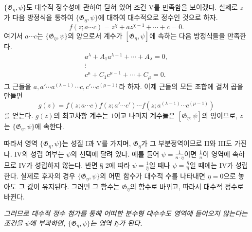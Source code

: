 $\{\mathfrak G_\eta,\psi\}$도 대수적 정수성에 관하여 닫혀 있어 조건 V를 만족함을 보이겠다. 실제로 $z$가 다음 방정식을 통하여 $\{\mathfrak G_\eta,\psi\}$에 대하여 대수적으로 정수인 것으로 하자.
\[
 f(z;a\cdots c)=z^\chi+a z^{\chi-1}+\cdots+c=0.
\]
여기서 $a\cdots c$는 $\{\mathfrak G_\eta,\psi\}$의 양으로서 계수가 $[\mathfrak G_\eta,\psi]$에 속하는 다음 방정식들을 만족한다.
\[
\begin{gathered}
 a^\lambda+A_1a^{\lambda-1}+\cdots+A_\lambda=0,\\
 \vdots\\
 c^\mu+C_1c^{\mu-1}+\cdots+C_\mu=0.
\end{gathered}
\]
그 근들을 $a,a'\cdots a^{(\lambda-1)}\cdots c,c'\cdots c^{(\mu-1)}$라 하자. 이제 근들의 모든 조합에 걸쳐 곱을 만들면
\[
 g(z)=f(z;a\cdots c)f(z;a'\cdots c')\cdots
      f(z;a^{(\lambda-1)}\cdots c^{(\mu-1)})
\]
를 얻는다. $g(z)$의 최고차항 계수는 $1$이고 나머지 계수들은 $[\mathfrak G_\eta,\psi]$의 양이므로, $z$는 $\{\mathfrak G_\eta,\psi\}$에 속한다.

따라서 영역 $\{\mathfrak G_\eta,\psi\}$는 성질 I과 V를 가지며, $\mathfrak G_\eta$가 그 부분정역이므로 II와 III도 가진다. IV의 성립 여부는 $\psi$의 선택에 달려 있다. 예를 들어 $\psi=\frac{1}{n\cdot\eta}$이면 $\frac1n$이 영역에 속하므로 IV가 성립하지 않는다. 반면 § 2에 따라 $\psi=\frac1\eta$일 때나 $\psi=\frac{\eta}{n}$일 때에는 IV가 성립한다. 실제로 후자의 경우 $\{\mathfrak G_\eta,\psi\}$의 어떤 함수가 대수적 수를 나타내면 $\eta=0$으로 놓아도 그 값이 유지된다. 그러면 그 함수는 $\mathfrak G_\eta$의 함수로 바뀌고, 따라서 대수적 정수로 바뀐다.

\emph{그러므로 대수적 정수 첨가를 통해 어떠한 분수형 대수수도 영역에 들어오지 않는다는 조건을 $\psi$에 부과하면, $\{\mathfrak G_\eta,\psi\}$는 영역 $\mathfrak H$가 된다.}

